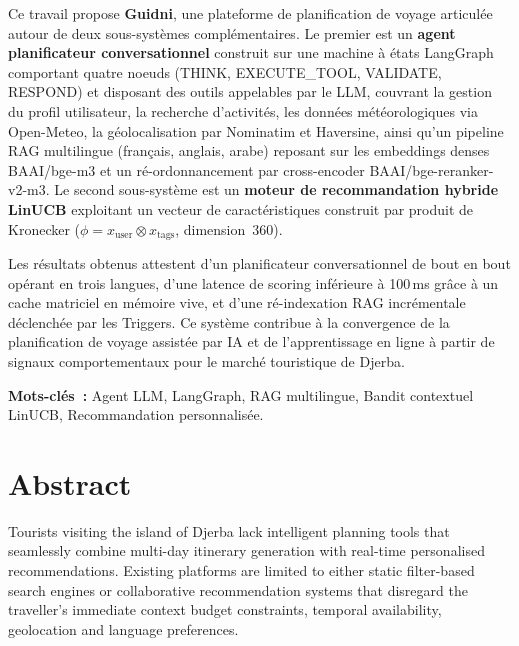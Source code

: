 Ce travail propose \textbf{Guidni}, une plateforme de planification de voyage
articulée autour de deux sous-systèmes complémentaires. Le premier est un
\textbf{agent planificateur conversationnel} construit sur une machine à états
LangGraph comportant quatre noeuds (THINK, EXECUTE\_TOOL, VALIDATE, RESPOND)
et disposant des outils appelables par le LLM, couvrant la gestion
du profil utilisateur, la recherche d'activités, les données météorologiques
via Open-Meteo, la géolocalisation par Nominatim et Haversine, ainsi qu'un
pipeline RAG multilingue (français, anglais, arabe) reposant sur les
embeddings denses BAAI/bge-m3 et un ré-ordonnancement par cross-encoder
BAAI/bge-reranker-v2-m3. Le second sous-système est un \textbf{moteur de
recommandation hybride LinUCB} exploitant un vecteur de caractéristiques
construit par produit de Kronecker ($\phi = x_{\text{user}} \otimes
x_{\text{tags}}$, dimension~360).

Les résultats obtenus attestent d'un planificateur conversationnel de bout en
bout opérant en trois langues, d'une latence de scoring inférieure à 100\,ms
grâce à un cache matriciel en mémoire vive, et d'une ré-indexation RAG
incrémentale déclenchée par les Triggers. Ce système contribue à
la convergence de la planification de voyage assistée par IA et de
l'apprentissage en ligne à partir de signaux comportementaux pour le marché
touristique de Djerba.

\vspace{0.8cm}
\noindent\textbf{Mots-clés~:} Agent LLM, LangGraph, RAG multilingue, Bandit
contextuel LinUCB, Recommandation personnalisée.


\newpage
\chapter*{Abstract}


Tourists visiting the island of Djerba lack intelligent planning tools that
seamlessly combine multi-day itinerary generation with real-time personalised
recommendations. Existing platforms are limited to either static filter-based
search engines or collaborative recommendation systems that disregard the
traveller's immediate context   budget constraints, temporal availability,
geolocation and language preferences.

